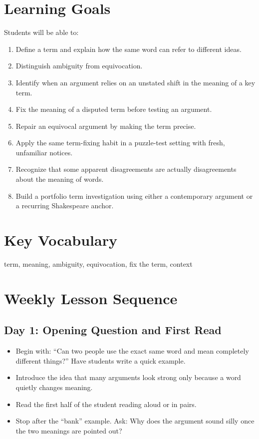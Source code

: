 \documentclass[12pt]{article}
\begin{document}
\section*{Learning Goals}
Students will be able to:
\begin{enumerate}[leftmargin=*]
\item Define a term and explain how the same word can refer to different ideas.
\item Distinguish ambiguity from equivocation.
\item Identify when an argument relies on an unstated shift in the meaning of a key term.
\item Fix the meaning of a disputed term before testing an argument.
\item Repair an equivocal argument by making the term precise.
\item Apply the same term-fixing habit in a puzzle-test setting with fresh, unfamiliar notices.
\item Recognize that some apparent disagreements are actually disagreements about the meaning of words.
\item Build a portfolio term investigation using either a contemporary argument or a recurring Shakespeare anchor.
\end{enumerate}

\section*{Key Vocabulary}
term, meaning, ambiguity, equivocation, fix the term, context

\section*{Weekly Lesson Sequence}

\subsection*{Day 1: Opening Question and First Read}
\begin{itemize}[leftmargin=*]
\item Begin with: “Can two people use the exact same word and mean completely different things?” Have students write a quick example.
\item Introduce the idea that many arguments look strong only because a word quietly changes meaning.
\item Read the first half of the student reading aloud or in pairs.
\item Stop after the “bank” example. Ask: Why does the argument sound silly once the two meanings are pointed out?
\end{itemize}
\end{document}
